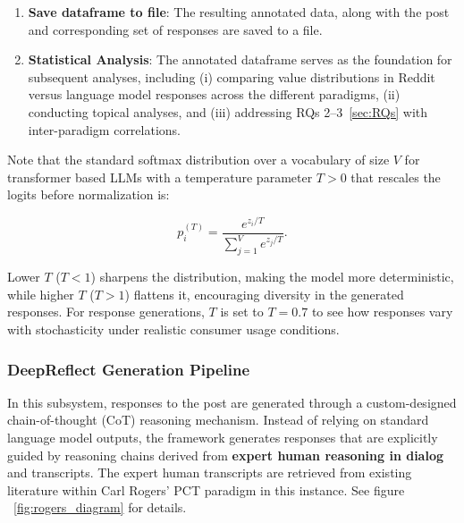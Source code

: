 \begin{enumerate}
    For the annotation step, human validation is performed with one expert annotator familiar with the research problem. The human annotator annotates on 100 post-response pairs. This validation along with LLM annotations is used to calculate Cohen's $\kappa$ and accuracy metrics in order to gauge the reliability of the annotations.
    \[
    \kappa = \frac{p_o - p_e}{1 - p_e},
    \]
    \[
    \begin{aligned}
    p_o &= \text{observed agreement (accuracy)} \\
    p_e &= \text{expected agreement by chance}
    \end{aligned}
    \]
    See section~\ref{sec:Methods} for validation metrics.

    \item \textbf{Save dataframe to file}: The resulting annotated data, along with the post and corresponding set of responses are saved to a file.

    \item \textbf{Statistical Analysis}: The annotated dataframe serves as the foundation for subsequent analyses, including (i) comparing value distributions in Reddit versus language model responses across the different paradigms, (ii) conducting topical analyses, and (iii) addressing RQs 2–3~\ref{sec:RQs} with inter-paradigm correlations.
\end{enumerate}

Note that the standard softmax distribution over a vocabulary of size $V$ for transformer based LLMs with a temperature parameter $T > 0$ that rescales the logits before normalization is: 

\begin{equation}
p_i^{(T)} = \frac{e^{z_i / T}}{\sum_{j=1}^{V} e^{z_j / T}}.
\label{eq:temp-softmax}
\end{equation}

Lower $T$ ($T<1$) sharpens the distribution, making the model more deterministic, while higher $T$ ($T>1$) flattens it, encouraging diversity in the generated responses. For response generations, $T$ is set to $T = 0.7$ to see how responses vary with stochasticity under realistic consumer usage conditions.

\subsubsection{DeepReflect Generation Pipeline}
In this subsystem, responses to the post are generated through a custom-designed chain-of-thought (CoT) reasoning mechanism. Instead of relying on standard language model outputs, the framework generates responses that are explicitly guided by reasoning chains derived from \textbf{expert human reasoning in dialog} and transcripts. The expert human transcripts are retrieved from existing literature within Carl Rogers' PCT paradigm \cite{rogersgloria} in this instance. See figure ~\ref{fig:rogers_diagram} for details.

